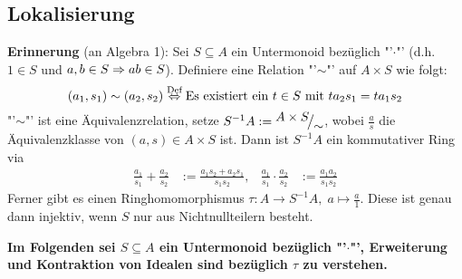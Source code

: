 \subsection{Lokalisierung}
\textbf{Erinnerung} (an Algebra 1): Sei $S\subseteq A$ ein Untermonoid bezüglich "'$\cdot$"' (d.h. $1\in S$ und $a,b\in S\Rightarrow ab\in S$). Definiere eine Relation "'$\sim$"' auf $A\times S$ wie folgt:
$$(a_1, s_1) \sim (a_2,s_2) \overset{\text{Def}}{\Leftrightarrow} \text{Es existiert ein }t\in S \text{ mit } ta_2s_1 = ta_1s_2$$
"'$\sim$"' ist eine Äquivalenzrelation, setze $S^{-1}A:= \QR{A\times S}{\sim}$, wobei $\frac{a}{s}$ die Äquivalenzklasse von $(a,s)\in A\times S$ ist. Dann ist $S^{-1}A$ ein kommutativer Ring via
\begin{align*}
\frac{a_1}{s_1} + \frac{a_2}{s_2} &:= \frac{a_1s_2+a_2s_1}{s_1s_2},&\frac{a_1}{s_1} \cdot \frac{a_2}{s_2} &:= \frac{a_1a_2}{s_1s_2}
\end{align*}
Ferner gibt es einen Ringhomomorphismus $\tau:A \to S^{-1}A, \; a \mapsto \frac{a}{1}$. Diese ist genau dann injektiv, wenn $S$ nur aus Nichtnullteilern besteht.\\
\begin{center}
	\textbf{Im Folgenden sei $S\subseteq A$ ein Untermonoid bezüglich "'$\cdot$"', Erweiterung und Kontraktion von Idealen sind bezüglich $\tau$ zu verstehen.}
\end{center}

~\

